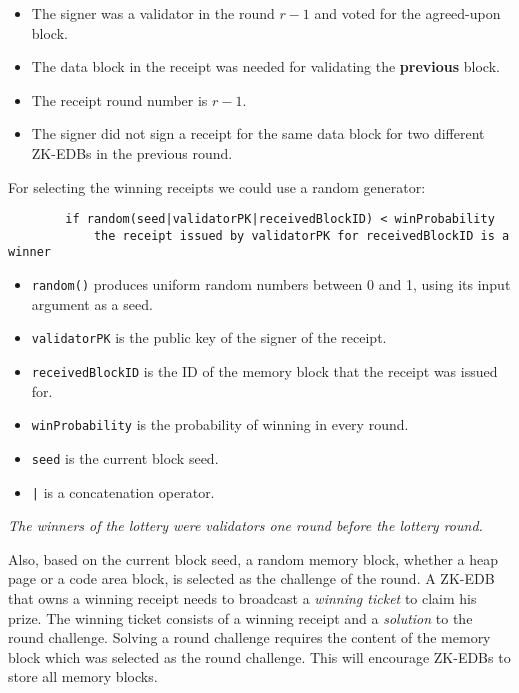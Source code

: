 \documentclass[11pt, A4]{article}
\begin{document}
    \begin{itemize}
        \item The signer was a validator in the round \(r - 1\) and voted for the agreed-upon block.
        \item The data block in the receipt was needed for validating the \textbf{previous} block.
        \item The receipt round number is \(r - 1\).
        \item The signer did not sign a receipt for the same data block for two different ZK-EDBs in the previous round.
    \end{itemize}

    For selecting the winning receipts we could use a random generator:

    \begin{verbatim}
        if random(seed|validatorPK|receivedBlockID) < winProbability
            the receipt issued by validatorPK for receivedBlockID is a winner
    \end{verbatim}

    \begin{itemize}
        \item \texttt{random()} produces uniform random numbers between 0 and 1, using its input argument as a seed.
        \item \texttt{validatorPK} is the public key of the signer of the receipt.
        \item \texttt{receivedBlockID} is the ID of the memory block that the receipt was issued for.
        \item \texttt{winProbability} is the probability of winning in every round.
        \item \texttt{seed} is the current block seed.
        \item \texttt{|} is a concatenation operator.
    \end{itemize}

    \emph{The winners of the lottery were validators one round before the lottery round.}

    Also, based on the current block seed, a random memory block, whether a heap page or a code area block, is
    selected as the challenge of the round. A ZK-EDB that owns a winning receipt needs to broadcast a \emph{winning
    ticket} to claim his prize. The winning ticket consists of a winning receipt and a \emph{solution} to the round
    challenge. Solving a round challenge requires the content of the memory block which was selected as the round
    challenge. This will encourage ZK-EDBs to store all memory blocks.
\end{document}
